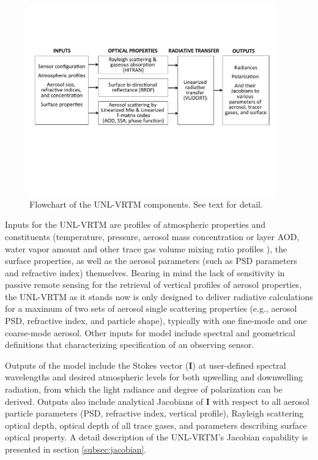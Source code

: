 \begin{figure}[t]
  \centering
  \includegraphics[width={0.95\textwidth}]{figures/unlvrtm.pdf}
  \caption{Flowchart of the UNL-VRTM components. See text for detail.}
  \label{fig:unlvrtm}
\end{figure}

Inputs for the UNL-VRTM are profiles of atmospheric properties and
constituents (temperature, pressure, aerosol mass concentration or layer
AOD, water vapor amount and other trace gas volume mixing ratio
profiles \citep{McClatchey72}), the surface properties, as well as 
the aerosol parameters  (such as PSD parameters and refractive index)
themselves. Bearing in mind the lack of
sensitivity in passive remote sensing for the retrieval of vertical
profiles of aerosol properties, the UNL-VRTM as it stands now is only
designed to deliver radiative calculations for a maximum of two sets of
aerosol single scattering properties (e.g., aerosol PSD,
refractive index, and particle shape), typically with one fine-mode and
one coarse-mode aerosol. Other inputs for model include spectral and
geometrical definitions that characterizing specification of an
observing sensor. 

Outputs of the model include the Stokes vector ($\mathbf{I}$) at
user-defined spectral wavelengths and desired atmospheric
levels for both upwelling and downwelling radiation, from which the
light radiance and degree of polarization can be derived. Outputs also
include analytical Jacobians of $\mathbf{I}$ with respect to all aerosol
particle parameters (PSD, refractive index, vertical profile), Rayleigh
scattering optical depth, optical depth of all trace gases, and
parameters describing surface optical property. A detail description of
the UNL-VRTM's Jacobian capability is presented in section
\ref{subsec:jacobian}. 


